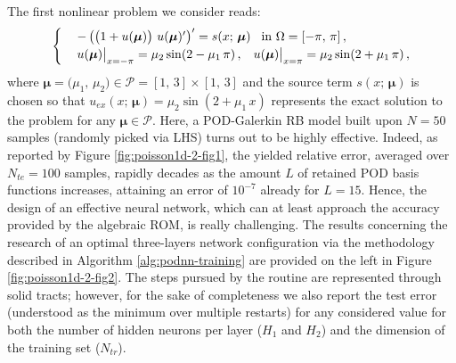 \documentclass[12pt, a4paper, twoside, openright]{report}
\numberwithin{equation}{chapter}
\theoremstyle{theorem}
\theoremstyle{definition}
\theoremstyle{remark}
\theoremstyle{proposition}
\numberwithin{figure}{chapter}
\newcommand{\bg}[1]{\boldsymbol{#1}}
\begin{document}
		The first nonlinear problem we consider reads:
		\begin{equation}
			\label{eq:poisson1d-2}
			\begin{cases}
				& - \left( \big( 1 + u(\bg{\mu}) \big) ~ u(\bg{\mu})' \right)' = s(x; \, \bg{\mu}) \hspace*{0.3cm} \text{in $\Omega = [-\pi, \, \pi]$} \, , \\
				& u(\bg{\mu}) \big|_{x = -\pi} = \mu_2 \sin(2 - \mu_1 \, \pi) \, , \hspace*{0.3cm} u(\bg{\mu}) \big|_{x = \pi} = \mu_2 \sin(2 + \mu_1 \, \pi)  \, ,
			\end{cases}
		\end{equation}
		where $\bg{\mu} = \big( \mu_1, \, \mu_2 \big) \in \mathcal{P} = [1, \, 3] \times [1, \, 3]$ and the source term $s(x; \, \bg{\mu})$ is chosen so that $u_{ex}(x; \, \bg{\mu}) = \mu_2 \sin(2 + \mu_1 \, x)$ represents the exact solution to the problem for any $\bg{\mu} \in \mathcal{P}$. Here, a POD-Galerkin RB model built upon $N = 50$ samples (randomly picked via LHS) turns out to be highly effective. Indeed, as reported by Figure \ref{fig:poisson1d-2-fig1}, the yielded relative error, averaged over $N_{te} = 100$ samples, rapidly decades as the amount $L$ of retained POD basis functions increases, attaining an error of $10^{-7}$ already for $L = 15$. Hence, the design of an effective neural network, which can at least approach the accuracy provided by the algebraic ROM, is really challenging. The results concerning the research of an optimal three-layers network configuration via the methodology described in Algorithm \ref{alg:podnn-training} are provided on the left in Figure \ref{fig:poisson1d-2-fig2}. The steps pursued by the routine are represented through solid tracts; however, for the sake of completeness we also report the test error (understood as the minimum over multiple restarts) for any considered value for both the number of hidden neurons per layer ($H_1$ and $H_2$) and the dimension of the training set ($N_{tr}$). 
		
\end{document}
